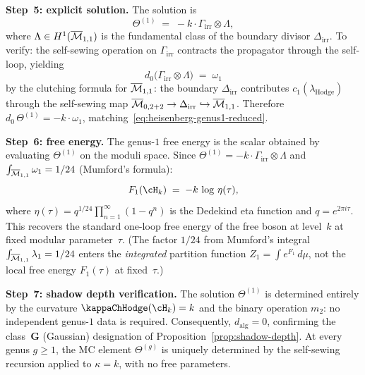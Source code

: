 \begin{computation}
\smallskip
\noindent
\textbf{Step~5: explicit solution.}
The solution is
\begin{equation}\label{eq:heisenberg-theta1}
\Theta^{(1)}
\;=\;
-k \cdot \Gamma_{\mathrm{irr}} \otimes \Lambda,
\end{equation}
where
$\Lambda \in H^1(\overline{\mathcal{M}}_{1,1})$ is the fundamental class
of the boundary divisor $\Delta_{\mathrm{irr}}$. To verify:
the self-sewing operation on $\Gamma_{\mathrm{irr}}$ contracts
the propagator through the self-loop, yielding
\[
d_0\!\bigl(\Gamma_{\mathrm{irr}} \otimes \Lambda\bigr)
\;=\;
\omega_1
\]
by the clutching formula for $\overline{\mathcal{M}}_{1,1}$: the boundary
$\Delta_{\mathrm{irr}}$ contributes
$c_1(\lambda_{\mathrm{Hodge}})$ through the self-sewing map
$\overline{\mathcal{M}}_{0,2+2} \to \Delta_{\mathrm{irr}} \hookrightarrow
\overline{\mathcal{M}}_{1,1}$. Therefore
$d_0\,\Theta^{(1)} = -k \cdot \omega_1$,
matching~\eqref{eq:heisenberg-genus1-reduced}.

\smallskip
\noindent
\textbf{Step~6: free energy.}
The genus-$1$ free energy is the scalar obtained by evaluating
$\Theta^{(1)}$ on the moduli space. Since
$\Theta^{(1)} = -k \cdot \Gamma_{\mathrm{irr}} \otimes \Lambda$
and $\int_{\overline{\mathcal{M}}_{1,1}} \omega_1 = 1/24$ (Mumford's formula):
\begin{equation}\label{eq:heisenberg-F1}
F_1(\cH_k)
\;=\;
-k\,\log\,\eta(\tau),
\end{equation}
where $\eta(\tau) = q^{1/24}\prod_{n=1}^\infty (1 - q^n)$
is the Dedekind eta function and $q = e^{2\pi i \tau}$.
This recovers the standard one-loop free energy of the
free boson at level~$k$ at fixed modular parameter~$\tau$.
(The factor $1/24$ from Mumford's integral
$\int_{\overline{\mathcal{M}}_{1,1}} \lambda_1 = 1/24$ enters the
\emph{integrated} partition function
$Z_1 = \int e^{F_1}\,d\mu$, not the local free
energy $F_1(\tau)$ at fixed~$\tau$.)

\smallskip
\noindent
\textbf{Step~7: shadow depth verification.}
The solution $\Theta^{(1)}$ is determined entirely by the
curvature $\kappaChHodge(\cH_k) = k$ and the binary operation $m_2$:
no independent genus-$1$ data is required. Consequently,
$d_{\mathrm{alg}} = 0$, confirming the class~$\mathbf{G}$
(Gaussian) designation of
Proposition~\ref{prop:shadow-depth}. At every genus
$g \ge 1$, the MC element $\Theta^{(g)}$ is uniquely determined
by the self-sewing recursion applied to $\kappa = k$, with no
free parameters.
\end{computation}

